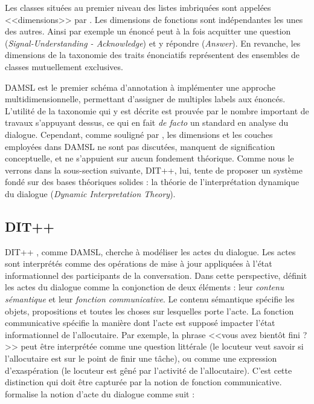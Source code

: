 \documentclass[10pt,a4paper,twoside]{article}
\begin{document}
Les classes situées au premier niveau des listes imbriquées sont appelées <<dimensions>> par \citeauthor{core1997coding}. Les dimensions de fonctions sont indépendantes les unes des autres. Ainsi par exemple un énoncé peut à la fois acquitter une question (\textit{Signal-Understanding - Acknowledge}) et y répondre (\textit{Answer}). En revanche, les dimensions de la taxonomie des traits énonciatifs représentent des ensembles de classes mutuellement exclusives.

DAMSL est le premier schéma d'annotation à implémenter une approche multidimensionnelle, permettant d'assigner de multiples labels aux énoncés. L'utilité de la taxonomie qui y est décrite est prouvée par le nombre important de travaux s'appuyant dessus, ce qui en fait \textit{de facto} un standard en analyse du dialogue. Cependant, comme souligné par \citet{bunt2006dimensions}, les dimensions et les couches employées dans DAMSL ne sont pas discutées, manquent de signification conceptuelle, et ne s'appuient sur aucun fondement théorique. Comme nous le verrons dans la sous-section suivante, DIT++, lui, tente de proposer un système fondé sur des bases théoriques solides : la théorie de l'interprétation dynamique du dialogue (\textit{Dynamic Interpretation Theory}).

\subsection{DIT++}
\label{subsec:DIT}

DIT++ \cite{bunt2009dit++}, comme DAMSL, cherche à modéliser les actes du dialogue. Les actes sont interprétés comme des opérations de mise à jour appliquées à l'état informationnel des participants de la conversation. Dans cette perspective, \citeauthor{bunt2009dit++} définit les actes du dialogue comme la conjonction de deux éléments : leur \textit{contenu sémantique} et leur \textit{fonction communicative}. Le contenu sémantique spécifie les objets, propositions et toutes les choses sur lesquelles porte l'acte. La fonction communicative spécifie la manière dont l'acte est supposé impacter l'état informationnel de l'allocutaire. Par exemple, la phrase <<vous avez bientôt fini ?>> peut être interprétée comme une question littérale (le locuteur veut savoir si l'allocutaire est sur le point de finir une tâche), ou comme une expression d'exaspération (le locuteur est gêné par l'activité de l'allocutaire). C'est cette distinction qui doit être capturée par la notion de fonction communicative. \citeauthor{bunt2006dimensions} formalise la notion d'acte du dialogue comme suit \cite{bunt2009dit++} :
\end{document}
